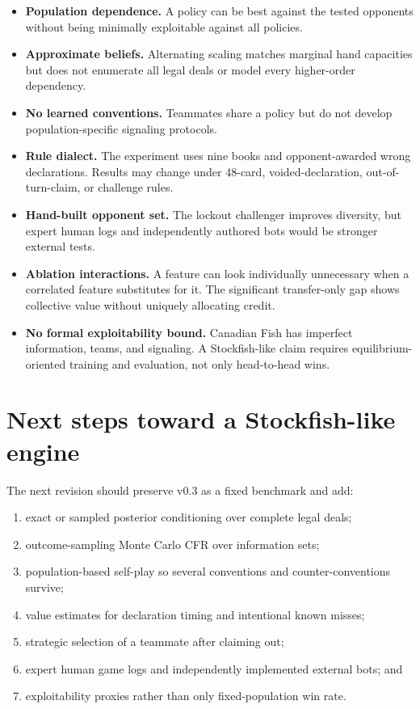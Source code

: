 \documentclass[11pt]{article}
\begin{document}
\begin{itemize}
  \item \textbf{Population dependence.} A policy can be best against the tested opponents without being minimally exploitable against all policies.
  \item \textbf{Approximate beliefs.} Alternating scaling matches marginal hand capacities but does not enumerate all legal deals or model every higher-order dependency.
  \item \textbf{No learned conventions.} Teammates share a policy but do not develop population-specific signaling protocols.
  \item \textbf{Rule dialect.} The experiment uses nine books and opponent-awarded wrong declarations. Results may change under 48-card, voided-declaration, out-of-turn-claim, or challenge rules.
  \item \textbf{Hand-built opponent set.} The lockout challenger improves diversity, but expert human logs and independently authored bots would be stronger external tests.
  \item \textbf{Ablation interactions.} A feature can look individually unnecessary when a correlated feature substitutes for it. The significant transfer-only gap shows collective value without uniquely allocating credit.
  \item \textbf{No formal exploitability bound.} Canadian Fish has imperfect information, teams, and signaling. A Stockfish-like claim requires equilibrium-oriented training and evaluation, not only head-to-head wins.
\end{itemize}

\section{Next steps toward a Stockfish-like engine}

The next revision should preserve v0.3 as a fixed benchmark and add:

\begin{enumerate}
  \item exact or sampled posterior conditioning over complete legal deals;
  \item outcome-sampling Monte Carlo CFR over information sets;
  \item population-based self-play so several conventions and counter-conventions survive;
  \item value estimates for declaration timing and intentional known misses;
  \item strategic selection of a teammate after claiming out;
  \item expert human game logs and independently implemented external bots; and
  \item exploitability proxies rather than only fixed-population win rate.
\end{enumerate}
\end{document}

